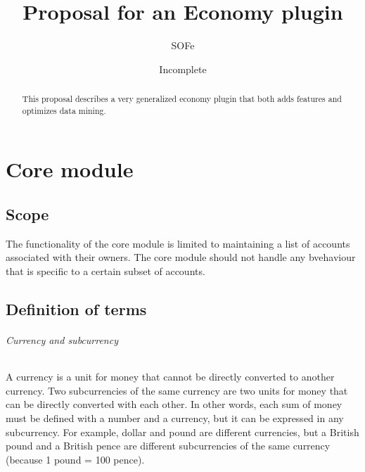 \documentclass{report}
\title{Proposal for an Economy plugin}
\date{Incomplete}
\author{SOFe}
\begin{document}

	\maketitle
	\tableofcontents

	\begin{abstract}
		This proposal describes a very generalized economy plugin that both adds features and optimizes data mining.
	\end{abstract}

	\part{Core module}
		\chapter{Scope}
			The functionality of the core module is limited to maintaining a list of accounts associated with their owners. The core module should not handle any bvehaviour that is specific to a certain subset of accounts.

		\chapter{Definition of terms}
			\paragraph{Currency and subcurrency}
				A currency is a unit for money that cannot be directly converted to another currency. Two subcurrencies of the same currency are two units for money that can be directly converted with each other. In other words, each sum of money must be defined with a number and a currency, but it can be expressed in any subcurrency. For example, dollar and pound are different currencies, but a British pound and a British pence are different subcurrencies of the same currency (because 1 pound = 100 pence).
\end{document}
